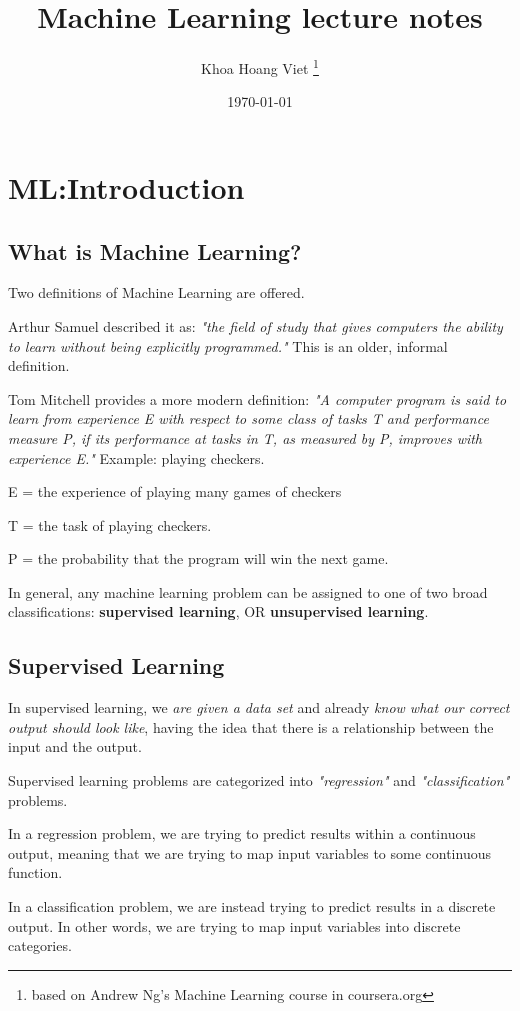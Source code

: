 \documentclass{article}
\title{Machine Learning lecture notes}
\author{Khoa Hoang Viet \thanks{based on Andrew Ng's Machine Learning course in coursera.org}}
\date{\today}
\begin{document}
\section{ML:Introduction}
\subsection{What is Machine Learning?}

Two definitions of Machine Learning are offered. 

Arthur Samuel described it as: \textit{"the field of study that gives computers the ability to learn without being explicitly programmed."} This is an older, informal definition.

Tom Mitchell provides a more modern definition: \textit{"A computer program is said to learn from experience E with respect to some class of tasks T and performance measure P, if its performance at tasks in T, as measured by P, improves with experience E."}\newline
Example: playing checkers.

E = the experience of playing many games of checkers

T = the task of playing checkers.

P = the probability that the program will win the next game.

In general, any machine learning problem can be assigned to one of two broad classifications: \textbf{supervised learning}, OR \textbf{unsupervised learning}.

\subsection{Supervised Learning}

In supervised learning, we \textit{are given a data set} and already \textit{know what our correct output should look like}, having the idea that there is a relationship between the input and the output.

Supervised learning problems are categorized into \textit{"regression"} and \textit{"classification"} problems. 

In a regression problem, we are trying to predict results within a continuous output, meaning that we are trying to map input variables to some continuous function. 

In a classification problem, we are instead trying to predict results in a discrete output. In other words, we are trying to map input variables into discrete categories.
\end{document}
